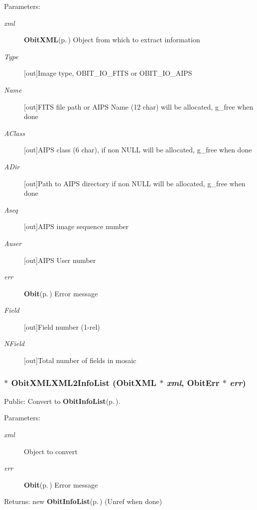 \begin{Desc}
\item[Parameters:]
\begin{description}
\item[{\em xml}]{\bf Obit\-XML}{\rm (p.\,\pageref{structObitXML})} Object from which to extract information \item[{\em Type}][out]Image type, OBIT\_\-IO\_\-FITS or OBIT\_\-IO\_\-AIPS \item[{\em Name}][out]FITS file path or AIPS Name (12 char) will be allocated, g\_\-free when done \item[{\em AClass}][out]AIPS class (6 char), if non NULL will be allocated, g\_\-free when done \item[{\em ADir}][out]Path to AIPS directory if non NULL will be allocated, g\_\-free when done \item[{\em Aseq}][out]AIPS image sequence number \item[{\em Auser}][out]AIPS User number \item[{\em err}]{\bf Obit}{\rm (p.\,\pageref{structObit})} Error message \item[{\em Field}][out]Field number (1-rel) \item[{\em NField}][out]Total number of fields in mosaic \end{description}
\end{Desc}
\subsubsection{$\ast$ Obit\-XMLXML2Info\-List ({\bf Obit\-XML} $\ast$ {\em xml}, {\bf Obit\-Err} $\ast$ {\em err})}\label{ObitXML_8h_a24}


Public: Convert to {\bf Obit\-Info\-List}{\rm (p.\,\pageref{structObitInfoList})}. 

\begin{Desc}
\item[Parameters:]
\begin{description}
\item[{\em xml}]Object to convert \item[{\em err}]{\bf Obit}{\rm (p.\,\pageref{structObit})} Error message \end{description}
\end{Desc}
\begin{Desc}
\item[Returns:]new {\bf Obit\-Info\-List}{\rm (p.\,\pageref{structObitInfoList})} (Unref when done) \end{Desc}
